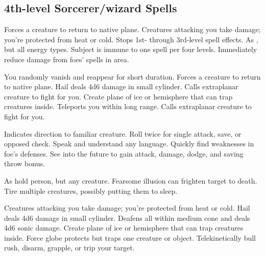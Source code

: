 \subsection{4th-level Sorcerer/wizard Spells} 
\begin{swspelllist}
   Forces a creature to return to native plane.
   Creatures attacking you take damage; you're protected from heat or cold.
   Stops 1st- through 3rd-level spell effects.
   As , but all energy types.
   Subject is immune to one spell per four levels.
   Immediately reduce damage from foes' spells in area.
  \spellheadrestricted{}

   You randomly vanish and reappear for short duration.
   Forces a creature to return to native plane.
   Hail deals 4d6 damage in small cylinder.
   Calls extraplanar creature to fight for you.
   Create plane of ice or hemisphere that can trap creatures inside.
   Teleports you within long range.
   Calls extraplanar creature to fight for you.

   Indicates direction to familiar creature.
   Roll twice for single attack, save, or opposed check.
   Speak and understand any language.
   Quickly find weaknesses in foe's defenses.
   See into the future to gain attack, damage, dodge, and saving throw bonus.

   As hold person, but any creature.
   Fearsome illusion can frighten target to death.
   Tire multiple creatures, possibly putting them to sleep.
  \spellheadrestricted{}
  \spellheadrestricted{}

   Creatures attacking you take damage; you're protected from heat or cold.
   Hail deals 4d6 damage in small cylinder.
   Deafens all within medium cone and deals 4d6 sonic damage.
   Create plane of ice or hemisphere that can trap creatures inside.
   Force globe protects but traps one creature or object.
   Telekinetically bull rush, disarm, grapple, or trip your target.


\end{swspelllist}
